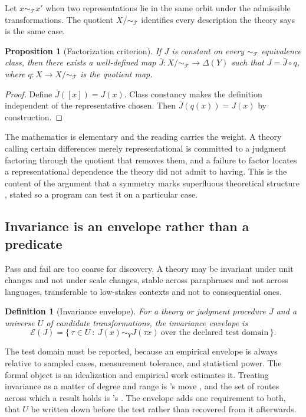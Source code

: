 \documentclass[11pt]{article}
\newtheorem{definition}{Definition}
\newtheorem{proposition}{Proposition}
\theoremstyle{remark}
\begin{document}
Let $x \sim_{\mathcal{T}} x'$ when two representations lie in the same orbit under
the admissible transformations. The quotient $X / \sim_{\mathcal{T}}$ identifies
every description the theory says is the same case.

\begin{proposition}[Factorization criterion]
If $J$ is constant on every $\sim_{\mathcal{T}}$ equivalence class, then there
exists a well-defined map
$\bar{J} : X/\sim_{\mathcal{T}} \to \Delta(Y)$ such that
$J = \bar{J} \circ q$, where $q : X \to X/\sim_{\mathcal{T}}$ is the quotient map.
\end{proposition}

\begin{proof}
Define $\bar{J}([x]) = J(x)$. Class constancy makes the definition independent of
the representative chosen. Then $\bar{J}(q(x)) = J(x)$ by construction.
\end{proof}

The mathematics is elementary and the reading carries the weight. A theory calling
certain differences merely representational is committed to a judgment factoring
through the quotient that removes them, and a failure to factor locates a
representational dependence the theory did not admit to having. This is the content
of the argument that a symmetry marks superfluous theoretical structure
\citep{ismael2003}, stated so a program can test it on a particular case.

\subsection{Invariance is an envelope rather than a predicate}

Pass and fail are too coarse for discovery. A theory may be invariant under unit
changes and not under scale changes, stable across paraphrases and not across
languages, transferable to low-stakes contexts and not to consequential ones.

\begin{definition}[Invariance envelope]
For a theory or judgment procedure $J$ and a universe $U$ of candidate
transformations, the invariance envelope is
\begin{equation}
\mathcal{E}(J) = \{\, \tau \in U \ : \ J(x) \sim_Y J(\tau x)
\ \text{over the declared test domain} \,\}.
\end{equation}
\end{definition}

The test domain must be reported, because an empirical envelope is always relative
to sampled cases, measurement tolerance, and statistical power. The formal object
is an idealization and empirical work estimates it. Treating invariance as a matter
of degree and range is \citeauthor{woodward2003}'s move
\citeyearpar{woodward2003}, and the set of routes across which a result holds is
\citeauthor{wimsatt1981}'s \citeyearpar{wimsatt1981}. The envelope adds one
requirement to both, that $U$ be written down before the test rather than recovered
from it afterwards.
\end{document}
